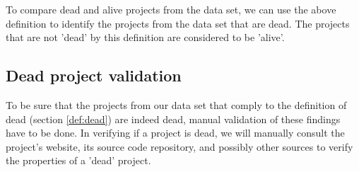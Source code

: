 To compare dead and alive projects from the data set, we can use the above
definition to identify the projects from the data set that are dead. The
projects that are not 'dead' by this definition are considered to be 'alive'.

\subsection{Dead project validation}
To be sure that the projects from our data set that comply to the definition of
dead (section \ref{def:dead}) are indeed dead, manual validation of these
findings have to be done.
In verifying if a project is dead, we will manually consult the project's
website, its source code repository, and possibly other sources to verify the
properties of a 'dead' project.

\begin{comment}
- The plan
- Methodology / method per question
- Hypotheses
- Validation

This section describes the methods used to answer the research questions. A
good structure of this section often follows the sub questions by providing a
method for each.

The research method can be based on the “Scientific method”, but more creative
solutions could be defined as well. In any case, the method needs a thorough
motivation grounded in theory in order to be acceptable.

As part of the method a number of hypotheses are described. These hypotheses
will be tested by the research, using the methods described here.

An important part of this section is validation. How will you evaluate and
validate the outcomes of the research? You can look at Paul Klint’s homepage
for examples of this section as
well\footnote{http://homepages.cwi.nl/~paulk/thesesMasterSoftwareEngineering/2006/RichardKettelerij.pdf}.
\end{comment}